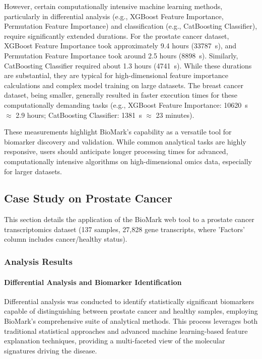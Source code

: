 \documentclass[journal]{IEEEtran}
\begin{document}
However, certain computationally intensive machine learning methods, particularly in differential analysis (e.g., XGBoost Feature Importance, Permutation Feature Importance) and classification (e.g., CatBoosting Classifier), require significantly extended durations. For the prostate cancer dataset, XGBoost Feature Importance took approximately 9.4 hours (\SI{33787}{\second}), and Permutation Feature Importance took around 2.5 hours (\SI{8898}{\second}). Similarly, CatBoosting Classifier required about 1.3 hours (\SI{4741}{\second}). While these durations are substantial, they are typical for high-dimensional feature importance calculations and complex model training on large datasets. The breast cancer dataset, being smaller, generally resulted in faster execution times for these computationally demanding tasks (e.g., XGBoost Feature Importance: \SI{10620}{\second} $\approx$ 2.9 hours; CatBoosting Classifier: \SI{1381}{\second} $\approx$ 23 minutes).

These measurements highlight BioMark's capability as a versatile tool for biomarker discovery and validation. While common analytical tasks are highly responsive, users should anticipate longer processing times for advanced, computationally intensive algorithms on high-dimensional omics data, especially for larger datasets.

\subsection{Case Study on Prostate Cancer}
This section details the application of the BioMark web tool to a prostate cancer transcriptomics dataset (137 samples, 27,828 gene transcripts, where 'Factors' column includes cancer/healthy status).

\subsubsection{Analysis Results}
\paragraph{Differential Analysis and Biomarker Identification}
Differential analysis was conducted to identify statistically significant biomarkers capable of distinguishing between prostate cancer and healthy samples, employing BioMark's comprehensive suite of analytical methods. This process leverages both traditional statistical approaches and advanced machine learning-based feature explanation techniques, providing a multi-faceted view of the molecular signatures driving the disease.
\end{document}

